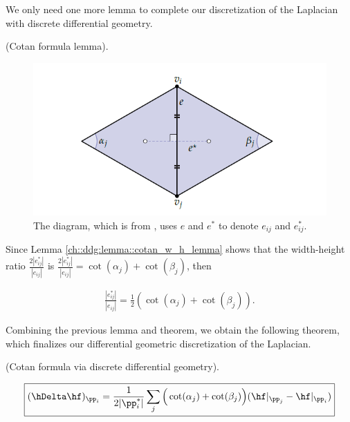 We only need one more lemma to complete our discretization of the Laplacian with discrete differential geometry.

\begin{lemma}
    (Cotan formula lemma).
    
    \begin{figure}[H]
        \centering
        \includegraphics{images/DEC_cotan_formula.PNG}
        \caption{The diagram, which is from \cite[p. 110]{book::DDG}, uses $e$ and $e^*$ to denote $e_{ij}$ and $e_{ij}^*$.}
    \end{figure}
    
    Since Lemma \ref{ch::ddg:lemma::cotan_w_h_lemma} shows that the width-height ratio $\frac{2|e_{ij}^*|}{|e_{ij}|}$ is $\frac{2|e_{ij}^*|}{|e_{ij}|} = \cot(\alpha_j) + \cot(\beta_j)$, then
    
    \begin{align*}
        \frac{|e_{ij}^*|}{|e_{ij}|} = \frac{1}{2}(\cot(\alpha_j) + \cot(\beta_j)).
    \end{align*}
\end{lemma}

Combining the previous lemma and theorem, we obtain the following theorem, which finalizes our differential geometric discretization of the Laplacian.

\begin{theorem}
    (Cotan formula via discrete differential geometry).
    
    \begin{align*}
        \boxed
        {
            (\hDelta \hf)_{\pp_i} = \frac{1}{2 |\pp_i^*|} \sum_j \Big( \cot(\alpha_j) + \cot(\beta_j) \Big) (\hf|_{\pp_j} - \hf|_{\pp_i})
        }
    \end{align*}
    
\end{theorem}

